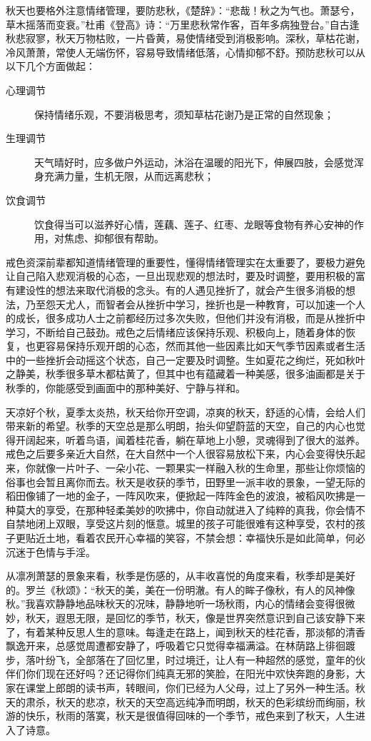 秋天也要格外注意情绪管理，要防悲秋，《楚辞》：“悲哉！秋之为气也。萧瑟兮，草木摇落而变衰。”杜甫《登高》诗：“万里悲秋常作客，百年多病独登台。”自古逢秋悲寂寥，秋天万物枯败，一片昏黄，易使情绪受到消极影响。深秋，草枯花谢，冷风萧萧，常使人无端伤怀，容易导致情绪低落，心情抑郁不舒。预防悲秋可以从以下几个方面做起：

\begin{description}
    \item[心理调节] 保持情绪乐观，不要消极思考，须知草枯花谢乃是正常的自然现象；
    \item[生理调节] 天气晴好时，应多做户外运动，沐浴在温暖的阳光下，伸展四肢，会感觉浑身充满力量，生机无限，从而远离悲秋；
    \item[饮食调节] 饮食得当可以滋养好心情，莲藕、莲子、红枣、龙眼等食物有养心安神的作用，对焦虑、抑郁很有帮助。
\end{description}

戒色资深前辈都知道情绪管理的重要性，懂得情绪管理实在太重要了，要极力避免让自己陷入悲观消极的心态，一旦出现悲观的想法时，要及时调整，要用积极的富有建设性的想法来取代消极的念头。有的人遇见挫折了，就会产生很多消极的想法，乃至怨天尤人，而智者会从挫折中学习，挫折也是一种教育，可以加速一个人的成长，很多成功人士之前都经历过多次失败，但他们并没有消极，而是从挫折中学习，不断给自己鼓劲。戒色之后情绪应该保持乐观、积极向上，随着身体的恢复，也更容易保持乐观开朗的心态，然而其他一些因素比如天气季节因素或者生活中的一些挫折会动摇这个状态，自己一定要及时调整。生如夏花之绚烂，死如秋叶之静美，秋季很多草木都枯黄了，但其中也有蕴藏着一种美感，很多油画都是关于秋季的，你能感受到画面中的那种美好、宁静与祥和。

天凉好个秋，夏季太炎热，秋天给你开空调，凉爽的秋天，舒适的心情，会给人们带来新的希望。秋季的天空总是那么明朗，抬头仰望蔚蓝的天空，自己的内心也觉得开阔起来，听着鸟语，闻着桂花香，躺在草地上小憩，灵魂得到了很大的滋养。戒色之后要多亲近大自然，在大自然中一个人很容易放松下来，内心会变得快乐起来，你就像一片叶子、一朵小花、一颗果实一样融入秋的生命里，那些让你烦恼的俗事也会暂且离你而去。秋天是收获的季节，田野里一派丰收的景象，一望无际的稻田像铺了一地的金子，一阵风吹来，便掀起一阵阵金色的波浪，被稻风吹拂是一种莫大的享受，在那种轻柔美妙的吹拂中，你自动就进入了纯粹的真我，你会情不自禁地闭上双眼，享受这片刻的惬意。城里的孩子可能很难有这种享受，农村的孩子更贴近土地，看着农民开心幸福的笑容，不禁会想：幸福快乐是如此简单，何必沉迷于色情与手淫。

从凛冽萧瑟的景象来看，秋季是伤感的，从丰收喜悦的角度来看，秋季却是美好的。罗兰《秋颂》：“秋天的美，美在一份明澈。有人的眸子像秋，有人的风神像秋。”我喜欢静静地品味秋天的况味，静静地听一场秋雨，内心的情绪会变得很微妙，秋天，遐思无限，是回忆的季节，秋天，像是世界突然意识到自己该安静下来了，有着某种反思人生的意味。每逢走在路上，闻到秋天的桂花香，那淡郁的清香飘逸开来，总感觉周遭都安静了，呼吸着它只觉得幸福满溢。在林荫路上徘徊踱步，落叶纷飞，全部落在了回忆里，时过境迁，让人有一种超然的感觉，童年的伙伴们你们现在还好吗？还记得你们纯真无邪的笑脸，在阳光中欢快奔跑的身影，大家在课堂上郎朗的读书声，转眼间，你们已经为人父母，过上了另外一种生活。秋天的肃杀，秋天的悲凉，秋天的天空高远纯净而明朗，秋天的色彩缤纷而绚丽，秋游的快乐，秋雨的落寞，秋天是很值得回味的一个季节，戒色来到了秋天，人生进入了诗意。

